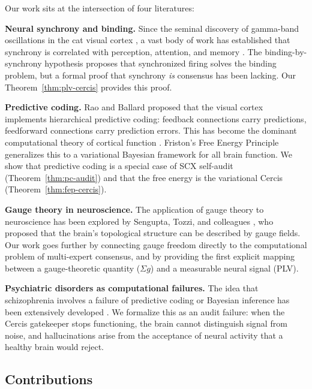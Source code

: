 \documentclass[12pt,a4paper]{article}
\theoremstyle{remark}
\newcommand{\Cercis}{\textsf{Cercis}}
\begin{document}
Our work sits at the intersection of four literatures:

\textbf{Neural synchrony and binding.} Since the seminal discovery of
gamma-band oscillations in the cat visual cortex \cite{gray1989oscillatory},
a vast body of work has established that synchrony is correlated with
perception, attention, and memory \cite{fries2015rhythms, singer1999neuronal,
buzsaki2006rhythms}. The binding-by-synchrony hypothesis proposes that
synchronized firing solves the binding problem, but a formal proof that
synchrony \emph{is} consensus has been lacking. Our Theorem~\ref{thm:plv-cercis}
provides this proof.

\textbf{Predictive coding.} Rao and Ballard \cite{rao1999predictive} proposed
that the visual cortex implements hierarchical predictive coding: feedback
connections carry predictions, feedforward connections carry prediction errors.
This has become the dominant computational theory of cortical function
\cite{friston2005theory, clark2013whatever, hohwy2013predictive}. Friston's
Free Energy Principle \cite{friston2010free, friston2006free} generalizes this
to a variational Bayesian framework for all brain function. We show that
predictive coding is a special case of SCX self-audit
(Theorem~\ref{thm:pc-audit}) and that the free energy is the variational
\Cercis{} (Theorem~\ref{thm:fep-cercis}).

\textbf{Gauge theory in neuroscience.} The application of gauge theory to
neuroscience has been explored by Sengupta, Tozzi, and colleagues
\cite{sengupta2016gauge, tozzi2017gauge}, who proposed that the brain's
topological structure can be described by gauge fields. Our work goes further
by connecting gauge freedom directly to the computational problem of
multi-expert consensus, and by providing the first explicit mapping between
a gauge-theoretic quantity ($\Sigma g$) and a measurable neural signal (PLV).

\textbf{Psychiatric disorders as computational failures.} The idea that
schizophrenia involves a failure of predictive coding or Bayesian inference
has been extensively developed \cite{fletcher2009perceiving, corlett2019schizophrenia,
adams2013computational, sterzer2018predictive}. We formalize this as an
audit failure: when the \Cercis{} gatekeeper stops functioning, the brain
cannot distinguish signal from noise, and hallucinations arise from the
acceptance of neural activity that a healthy brain would reject.

\subsection{Contributions}
\end{document}
